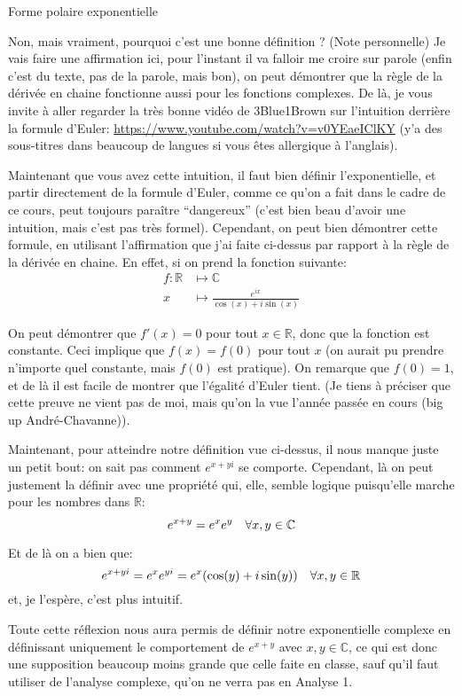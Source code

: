 \documentclass{article}
\begin{document}
\begin{parag}{Forme polaire exponentielle}
\begin{subparag}{Non, mais vraiment, pourquoi c'est une bonne définition ? (Note personnelle)}
        Je vais faire une affirmation ici, pour l'instant il va falloir me croire sur parole (enfin c'est du texte, pas de la parole, mais bon), on peut démontrer que la règle de la dérivée en chaine fonctionne aussi pour les fonctions complexes. De là, je vous invite à aller regarder la très bonne vidéo de 3Blue1Brown sur l'intuition derrière la formule d'Euler: \url{https://www.youtube.com/watch?v=v0YEaeIClKY} (y'a des sous-titres dans beaucoup de langues si vous êtes allergique à l'anglais).

        Maintenant que vous avez cette intuition, il faut bien définir l'exponentielle, et partir directement de la formule d'Euler, comme ce qu'on a fait dans le cadre de ce cours, peut toujours paraître ``dangereux'' (c'est bien beau d'avoir une intuition, mais c'est pas très formel). Cependant, on peut bien démontrer cette formule, en utilisant l'affirmation que j'ai faite ci-dessus par rapport à la règle de la dérivée en chaine. En effet, si on prend la fonction suivante:
        \[\begin{split}
        f: \mathbb{R} &\longmapsto \mathbb{C} \\
        x &\longmapsto \frac{e^{ix}}{\cos\left(x\right) + i\sin\left(x\right)}
        \end{split}\]

        On peut démontrer que $f'\left(x\right) = 0$ pour tout $x \in \mathbb{R}$, donc que la fonction est constante. Ceci implique que $f\left(x\right) = f\left(0\right)$ pour tout $x$ (on aurait pu prendre n'importe quel constante, mais $f\left(0\right)$ est pratique). On remarque que $f\left(0\right) = 1$, et de là il est facile de montrer que l'égalité d'Euler tient. (Je tiens à préciser que cette preuve ne vient pas de moi, mais qu'on la vue l'année passée en cours (big up André-Chavanne)).

        Maintenant, pour atteindre notre définition vue ci-dessus, il nous manque juste un petit bout: on sait pas comment $e^{x + yi}$ se comporte. Cependant, là on peut justement la définir avec une propriété qui, elle, semble logique puisqu'elle marche pour les nombres dans $\mathbb{R}$:
        \[e^{x + y} = e^{x} e^{y} \quad \forall x, y \in \mathbb{C}\]

        Et de là on a bien que:
        \[e^{x + yi} = e^{x} e^{yi} = e^{x} \left(\cos\left(y\right) + i\sin\left(y\right)\right) \mathspace \forall x, y \in \mathbb{R}\]
        et, je l'espère, c'est plus intuitif.

        Toute cette réflexion nous aura permis de définir notre exponentielle complexe en définissant uniquement le comportement de $e^{x + y}$ avec $x, y \in \mathbb{C}$, ce qui est donc une supposition beaucoup moins grande que celle faite en classe, sauf qu'il faut utiliser de l'analyse complexe, qu'on ne verra pas en Analyse 1.
    \end{subparag}
\end{parag}
\end{document}
